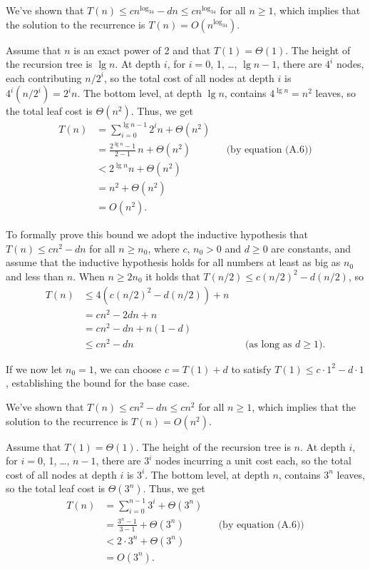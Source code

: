 We've shown that $T(n)\le cn^{\log_34}-dn\le cn^{\log_34}$ for all $n\ge1$, which implies that the solution to the recurrence is $T(n)=O(n^{\log_34})$.

\subexercise
Assume that $n$ is an exact power of 2 and that $T(1)=\Theta(1)$.
The height of the recursion tree is $\lg n$.
At depth $i$, for $i=0$, 1, \dots, $\lg n-1$, there are $4^i$ nodes, each contributing $n/2^i$, so the total cost of all nodes at depth $i$ is $4^i(n/2^i)=2^in$.
The bottom level, at depth $\lg n$, contains $4^{\lg n}=n^2$ leaves, so the total leaf cost is $\Theta(n^2)$.
Thus, we get
\begin{align*}
    T(n) &= \sum_{i=0}^{\lg n-1}2^in+\Theta(n^2) \\
    &= \frac{2^{\lg n}-1}{2-1}\,n+\Theta(n^2) && \text{(by equation (A.6))} \\[1mm]
    &< 2^{\lg n}n+\Theta(n^2) \\
    &= n^2+\Theta(n^2) \\
    &= O(n^2).
\end{align*}

To formally prove this bound we adopt the inductive hypothesis that $T(n)\le cn^2-dn$ for all $n\ge n_0$, where $c$, $n_0>0$ and $d\ge0$ are constants, and assume that the inductive hypothesis holds for all numbers at least as big as $n_0$ and less than $n$.
When $n\ge2n_0$ it holds that $T(n/2)\le c(n/2)^2-d(n/2)$, so
\begin{align*}
    T(n) &\le 4(c(n/2)^2-d(n/2))+n \\
    &= cn^2-2dn+n \\
    &= cn^2-dn+n(1-d) \\
    &\le cn^2-dn && \text{(as long as $d\ge1$)}.
\end{align*}

If we now let $n_0=1$, we can choose $c=T(1)+d$ to satisfy $T(1)\le c\cdot1^2-d\cdot1$, establishing the bound for the base case.

We've shown that $T(n)\le cn^2-dn\le cn^2$ for all $n\ge1$, which implies that the solution to the recurrence is $T(n)=O(n^2)$.

\subexercise
Assume that $T(1)=\Theta(1)$.
The height of the recursion tree is $n$.
At depth $i$, for $i=0$, 1, \dots, $n-1$, there are $3^i$ nodes incurring a unit cost each, so the total cost of all nodes at depth $i$ is $3^i$.
The bottom level, at depth $n$, contains $3^n$ leaves, so the total leaf cost is $\Theta(3^n)$.
Thus, we get
\begin{align*}
    T(n) &= \sum_{i=0}^{n-1}3^i+\Theta(3^n) \\[1mm]
    &= \frac{3^n-1}{3-1}+\Theta(3^n) && \text{(by equation (A.6))} \\[1mm]
    &< 2\cdot3^n+\Theta(3^n) \\
    &= O(3^n).
\end{align*}


